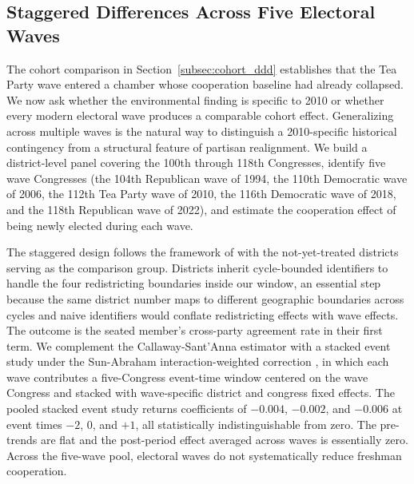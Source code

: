 \documentclass[12pt, a4paper]{article}
\begin{document}
\FloatBarrier
\subsection{Staggered Differences Across Five Electoral Waves}\label{subsec:staggered_did}

The cohort comparison in Section~\ref{subsec:cohort_ddd} establishes that the Tea Party wave entered a chamber whose cooperation baseline had already collapsed. We now ask whether the environmental finding is specific to 2010 or whether every modern electoral wave produces a comparable cohort effect. Generalizing across multiple waves is the natural way to distinguish a 2010-specific historical contingency from a structural feature of partisan realignment. We build a district-level panel covering the 100th through 118th Congresses, identify five wave Congresses (the 104th Republican wave of 1994, the 110th Democratic wave of 2006, the 112th Tea Party wave of 2010, the 116th Democratic wave of 2018, and the 118th Republican wave of 2022), and estimate the cooperation effect of being newly elected during each wave.

The staggered design follows the framework of \citet{callaway2021difference} with the not-yet-treated districts serving as the comparison group. Districts inherit cycle-bounded identifiers to handle the four redistricting boundaries inside our window, an essential step because the same district number maps to different geographic boundaries across cycles and naive identifiers would conflate redistricting effects with wave effects. The outcome is the seated member's cross-party agreement rate in their first term. We complement the Callaway-Sant'Anna estimator with a stacked event study under the Sun-Abraham interaction-weighted correction \citep{sun2021estimating}, in which each wave contributes a five-Congress event-time window centered on the wave Congress and stacked with wave-specific district and congress fixed effects. The pooled stacked event study returns coefficients of $-0.004$, $-0.002$, and $-0.006$ at event times $-2$, $0$, and $+1$, all statistically indistinguishable from zero. The pre-trends are flat and the post-period effect averaged across waves is essentially zero. Across the five-wave pool, electoral waves do not systematically reduce freshman cooperation.
\end{document}
